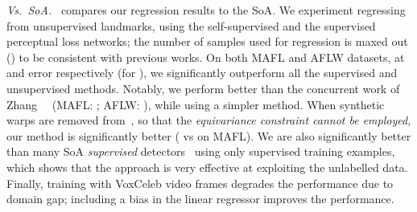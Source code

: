 \documentclass{article}
\begin{document}
\emph{Vs.~SoA.}~ compares our regression results to the SoA. We experiment regressing from  unsupervised landmarks, using the self-supervised and the supervised perceptual loss networks; the number of samples  used for regression is maxed out () to be consistent with previous works. On both MAFL and AFLW datasets, at  and  error respectively (for ), we significantly outperform all the supervised and unsupervised methods. Notably, we perform better than the concurrent work of Zhang~\etal~\cite{zhang2018unsupervised} (MAFL: ; AFLW: ), while using a simpler method. When synthetic warps are removed from~\cite{zhang2018unsupervised}, so that the \emph{equivariance constraint cannot be employed}, our method is significantly better ( vs  on MAFL). We are also significantly better than many SoA \emph{supervised} detectors~\cite{zhang2014coarse,sun2013deep,Zhang2016} using only  supervised training examples, which shows that the approach is very effective at exploiting the unlabelled data. Finally, training with VoxCeleb video frames degrades the performance due to domain gap; including a bias in the linear regressor improves the performance.\begin{center}
\begin{table}[b]
  \hspace{2mm}
  \begin{minipage}{.39\linewidth}
    \centering
    \setlength\tabcolsep{3pt}
  \end{minipage}\hspace{2mm}\begin{minipage}{.59\linewidth}
    \centering
    \setlength\tabcolsep{3pt}
\end{minipage}
\end{table}
\end{center}
\end{document}
